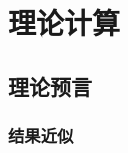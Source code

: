 \section{理论计算}%

\zhlipsum[2]

\subsection{理论预言}%

\zhlipsum[3]

\subsubsection{结果近似}%

\zhlipsum[4]